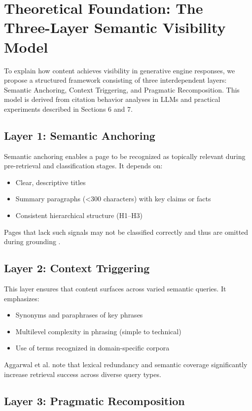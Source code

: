 \section{Theoretical Foundation: The Three-Layer Semantic Visibility Model}

To explain how content achieves visibility in generative engine responses, we propose a structured framework consisting of three interdependent layers: Semantic Anchoring, Context Triggering, and Pragmatic Recomposition. This model is derived from citation behavior analyses in LLMs \cite{aggarwal2024geo, luttgenau2025beyondseo} and practical experiments described in Sections 6 and 7.

\subsection{Layer 1: Semantic Anchoring}

Semantic anchoring enables a page to be recognized as topically relevant during pre-retrieval and classification stages. It depends on:
\begin{itemize}
  \item Clear, descriptive titles
  \item Summary paragraphs (<300 characters) with key claims or facts
  \item Consistent hierarchical structure (H1--H3)
\end{itemize}
Pages that lack such signals may not be classified correctly and thus are omitted during grounding \cite{liu2023verifiability}.

\subsection{Layer 2: Context Triggering}

This layer ensures that content surfaces across varied semantic queries. It emphasizes:
\begin{itemize}
  \item Synonyms and paraphrases of key phrases
  \item Multilevel complexity in phrasing (simple to technical)
  \item Use of terms recognized in domain-specific corpora
\end{itemize}
Aggarwal et al. \cite{aggarwal2024geo} note that lexical redundancy and semantic coverage significantly increase retrieval success across diverse query types.

\subsection{Layer 3: Pragmatic Recomposition}

